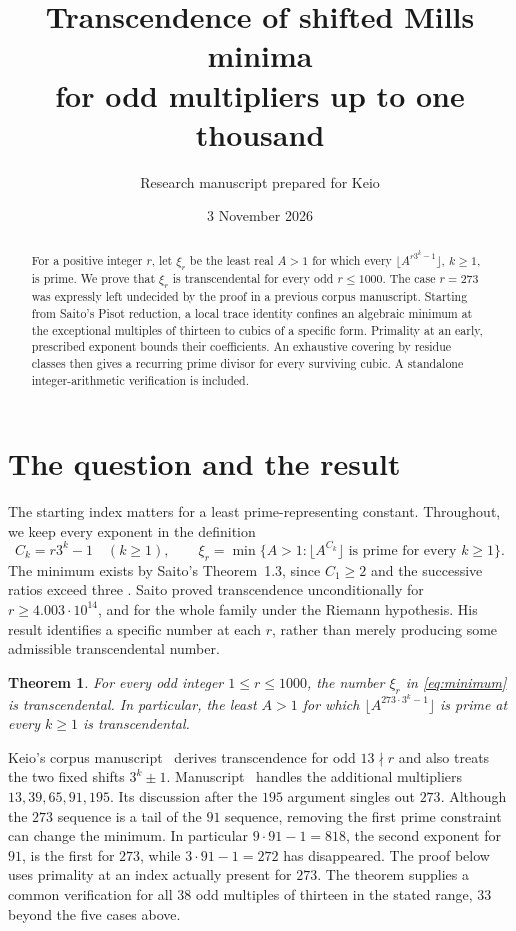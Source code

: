 \documentclass[11pt]{article}
\title{Transcendence of shifted Mills minima\\for odd multipliers up to one thousand}
\author{Research manuscript prepared for Keio}
\date{3 November 2026}
\newtheorem{theorem}{Theorem}
\begin{document}
\maketitle
\begin{abstract}
For a positive integer $r$, let $\xi_r$ be the least real $A>1$ for which every
$\lfloor A^{r3^k-1}\rfloor$, $k\ge1$, is prime. We prove that $\xi_r$ is
transcendental for every odd $r\le1000$. The case $r=273$ was expressly
left undecided by the proof in a previous corpus manuscript. Starting from
Saito's Pisot reduction, a local trace identity confines an algebraic minimum
at the exceptional multiples of thirteen to cubics of a specific form.
Primality at an early, prescribed exponent bounds their coefficients.
An exhaustive covering by residue classes then gives a recurring prime
divisor for every surviving cubic. A standalone integer-arithmetic
verification is included.
\end{abstract}

\section{The question and the result}
The starting index matters for a least prime-representing constant. Throughout,
we keep every exponent in the definition
\begin{equation}\label{eq:minimum}
 C_k=r3^k-1\quad(k\ge1),\qquad
 \xi_r=\min\{A>1:\lfloor A^{C_k}\rfloor\text{ is prime for every }k\ge1\}.
\end{equation}
The minimum exists by Saito's Theorem~1.3, since $C_1\ge2$ and the
successive ratios exceed three \cite{saito}. Saito proved transcendence
unconditionally for $r\ge4.003\cdot10^{14}$, and for the whole family
under the Riemann hypothesis. His result identifies a specific number
at each $r$, rather than merely producing some admissible transcendental number.

\begin{theorem}\label{thm:main}
For every odd integer $1\le r\le1000$, the number $\xi_r$ in
\eqref{eq:minimum} is transcendental. In particular, the least $A>1$ for
which $\lfloor A^{273\cdot 3^k-1}\rfloor$ is prime at every $k\ge1$ is
transcendental.
\end{theorem}

Keio's corpus manuscript~\cite{keio64} derives transcendence for odd
$13\nmid r$ and also treats the two fixed shifts $3^k\pm1$.
Manuscript~\cite{keio75} handles the additional multipliers
$13,39,65,91,195$. Its discussion after the $195$ argument singles out
$273$. Although the $273$ sequence is a tail of the $91$ sequence,
removing the first prime constraint can change the minimum.
In particular $9\cdot91-1=818$, the second exponent for $91$, is the first
for $273$, while $3\cdot91-1=272$ has disappeared. The proof below
uses primality at an index actually present for $273$.
The theorem supplies a common verification for all 38 odd multiples of
thirteen in the stated range, 33 beyond the five cases above.
\end{document}
